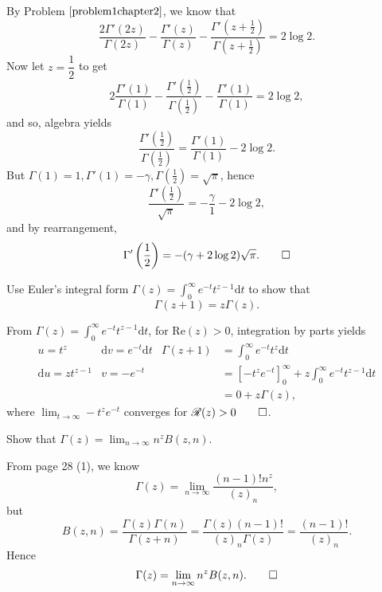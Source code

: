 \begin{solution}
By Problem $\ref{problem1chapter2}$, we know that
$$\dfrac{2 \Gamma'(2z)}{\Gamma(2z)} - \dfrac{\Gamma'(z)}{\Gamma(z)} - \dfrac{\Gamma'(z+\frac{1}{2})}{\Gamma(z+\frac{1}{2})} = 2 \log 2.$$
Now let $z=\dfrac{1}{2}$ to get
$$2 \dfrac{\Gamma'(1)}{\Gamma(1)} - \dfrac{\Gamma' \left(\frac{1}{2} \right)}{\Gamma \left(\frac{1}{2} \right)} - \frac{\Gamma'(1)}{\Gamma(1)} = 2 \log 2,$$
and so, algebra yields
$$\dfrac{\Gamma'(\frac{1}{2})}{\Gamma(\frac{1}{2})} =\dfrac{\Gamma'(1)}{\Gamma(1)} - 2 \log 2.$$
But $\Gamma(1)=1, \Gamma'(1)=-\gamma, \Gamma(\frac{1}{2}) = \sqrt{\pi}$, hence
$$\dfrac{\Gamma'(\frac{1}{2})}{\sqrt{\pi}} = - \dfrac{\gamma}{1} - 2 \log 2,$$
and by rearrangement,
$$\Gamma'\left(\frac{1}{2} \right) = -(\gamma + 2 \log 2) \sqrt{\pi}. \qed$$
\end{solution}
\begin{problem}\label{problem3chapter2}
Use Euler's integral form $\Gamma(z) = \displaystyle\int_0^{\infty} e^{-t} t^{z-1} \mathrm{d}t$ to show that 
$$\Gamma(z+1) = z \Gamma(z).$$
\end{problem}
\begin{solution}
From $\Gamma(z) = \displaystyle\int_0^{\infty} e^{-t} t^{z-1} \mathrm{d}t$, for $\mathrm{Re}(z) > 0$, integration by parts yields
$$\begin{array}{ll|ll}
u = t^z & \mathrm{d}v = e^{-t} \mathrm{d}t  & \Gamma(z+1) &= \displaystyle\int_0^{\infty} e^{-t}t^z \mathrm{d}t \\
\mathrm{d}u = zt^{z-1} & v=-e^{-t} & &= \left[-t^z e^{-t} \right]_0^{\infty} + z \displaystyle\int_0^{\infty} e^{-t} t^{z-1} \mathrm{d}t \\
& & &= 0 + z \Gamma(z),
\end{array}$$
where $\displaystyle\lim_{t \rightarrow \infty} -t^z e^{-t}$ converges for $\Re(z) > 0 \qed$.
\end{solution}
\begin{problem}\label{problem4chapter2}
Show that $\Gamma(z) = \displaystyle\lim_{n \rightarrow \infty} n^z B(z,n)$.
\end{problem}
\begin{solution}
From page 28 (1), we know
$$\Gamma(z) = \displaystyle\lim_{n \rightarrow \infty} \dfrac{(n-1)! n^z}{
(z)_n},$$
but
$$B(z,n) = \dfrac{\Gamma(z)\Gamma(n)}{\Gamma(z+n)} = \dfrac{\Gamma(z)(n-1)!}{(z)_n \Gamma(z)} = \dfrac{(n-1)!}{(z)_n}.$$
Hence 
$$\Gamma(z) = \displaystyle\lim_{n \rightarrow \infty} n^z B(z,n). \qed$$
\end{solution}
